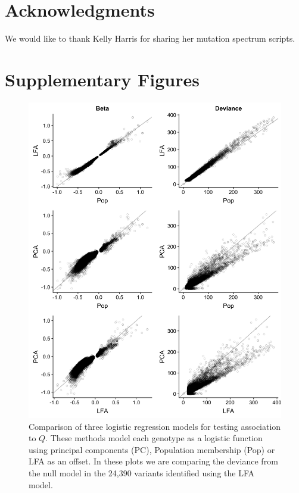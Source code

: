 \documentclass[custompaper]{MBE}%
\begin{document}
\section{Acknowledgments}
We would like to thank Kelly Harris for sharing her mutation spectrum scripts.





\clearpage
\section{Supplementary Figures}

\begin{figure}[h]
\centering
\includegraphics[width=15cm,keepaspectratio]{./Figures/fits_Significant_Positions_CompareModels.jpg}
\caption{Comparison of three logistic regression models for testing association to $Q$.
These methods model each genotype as a logistic function using principal components (PC), Population membership (Pop) or LFA as an offset.
In these plots we are comparing the deviance from the null model in the 24,390 variants identified using the LFA model.}  
\label{CompareModel}
\end{figure}
\end{document}
